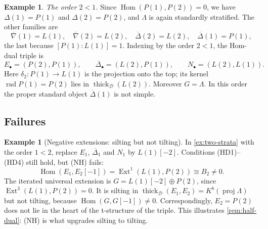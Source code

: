 \documentclass[11pt,reqno]{amsart}
\theoremstyle{plain}
\theoremstyle{definition}
\newtheorem{example}[theorem]{Example}
\theoremstyle{remark}
\DeclareMathOperator{\Hom}{Hom}
\DeclareMathOperator{\Ext}{Ext}
\DeclareMathOperator{\rad}{rad}
\newcommand{\proj}{\operatorname{proj}}
\newcommand{\Kb}{K^b}
\newcommand{\thick}[2][\cD]{\operatorname{thick}_{#1}(#2)}
\newcommand{\nablabar}{\overline{\nabla}}
\newcommand{\Deltabar}{\overline{\Delta}}
\newcommand{\cD}{\mathcal{D}}
\begin{document}
\begin{example}
\emph{The order $2<1$.} Since $\Hom(P(1),P(2))=0$, we have $\Delta(1)=P(1)$ and $\Delta(2)=P(2)$, and $\Lambda$ is again standardly stratified. The other families are
\[\nablabar(1)=L(1),\quad\nablabar(2)=L(2),\quad\Deltabar(2)=L(2),\quad\Deltabar(1)=P(1),\]
the last because $[P(1):L(1)]=1$. Indexing by the order $2<1$, the Hom-dual triple is
\[E_\bullet=(P(2),P(1)),\qquad\Deltabar_\bullet=(L(2),P(1)),\qquad N_\bullet=(L(2),L(1)).\]
Here $\delta_2\colon P(1)\to L(1)$ is the projection onto the top; its kernel $\rad P(1)=P(2)$ lies in $\thick{L(2)}$. Moreover $G=\Lambda$. In this order the proper standard object $\Deltabar(1)$ is not simple.
\end{example}

\subsection{Failures}

\begin{example}[Negative extensions: silting but not tilting]\label{ex:NH-fails}
In \cref{ex:two-strata} with the order $1<2$, replace $E_1$, $\Deltabar_1$ and $N_1$ by $L(1)[-2]$. Conditions (HD1)--(HD4) still hold, but (NH) fails:
\[\Hom(E_1,E_2[-1])=\Ext^1(L(1),P(2))\cong B_2\ne0.\]
The iterated universal extension is $G=L(1)[-2]\oplus P(2)$, since $\Ext^3(L(1),P(2))=0$. It is silting in $\thick{E_1,E_2}=\Kb(\proj\Lambda)$ but not tilting, because $\Hom(G,G[-1])\ne0$. Correspondingly, $E_2=P(2)$ does not lie in the heart of the t-structure of the triple. This illustrates \cref{rem:half-dual}: (NH) is what upgrades silting to tilting.
\end{example}
\end{document}
